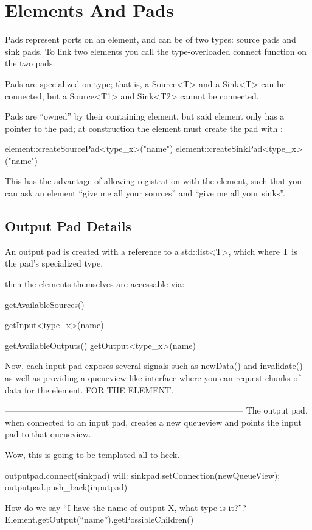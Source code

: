\section{Elements And Pads}

Pads represent ports on an element, and can be of two types:
source pads and sink pads. To link two elements you call the
type-overloaded connect function on the two pads. 

Pads are specialized on type; that is, a Source<T> and a Sink<T>
can be connected, but a Source<T1> and Sink<T2> cannot be connected. 

Pads are ``owned'' by their containing element, but said element
only has a pointer to the pad; at construction the element
must create the pad with : 


element::createSourcePad<type_x>("name")
element::createSinkPad<type_x>("name")

This has the advantage of allowing registration with the element, such
that you can ask an element ``give me all your sources'' and ``give me
all your sinks''. 

\subsection{Output Pad Details}
An output pad is created with a reference to a std::list<T>, which
where T is the pad's specialized type. 

then the elements themselves are accessable via: 

getAvailableSources()

getInput<type_x>(name)

getAvailableOutputs()
getOutput<type_x>(name)

Now, each input pad exposes several signals such as newData() and invalidate()
as well as providing a queueview-like interface where you can request chunks of
data for the element. FOR THE ELEMENT. 

------------------------------------------------------------------------------------
The output pad, when connected to an input pad, creates a new queueview and
points the input pad to that queueview. 

Wow, this is going to be templated all to heck. 

outputpad.connect(sinkpad) will: 
   sinkpad.setConnection(newQueueView); 
   outputpad.push_back(inputpad)
   

How do we say ``I have the name of output X, what type is it?''? 
Element.getOutput(``name'').getPossibleChildren()

